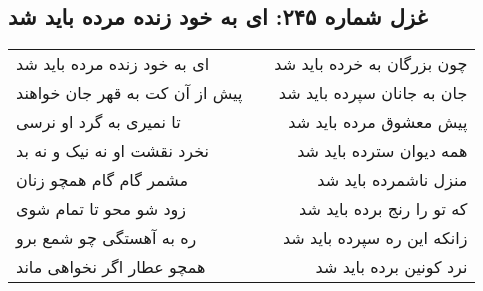 \begin{center}
\section*{غزل شماره ۲۴۵: ای به خود زنده مرده باید شد}
\label{sec:245}
\begin{longtable}{l p{0.5cm} r}
ای به خود زنده مرده باید شد
&&
چون بزرگان به خرده باید شد
\\
پیش از آن کت به قهر جان خواهند
&&
جان به جانان سپرده باید شد
\\
تا نمیری به گرد او نرسی
&&
پیش معشوق مرده باید شد
\\
نخرد نقشت او نه نیک و نه بد
&&
همه دیوان سترده باید شد
\\
مشمر گام گام همچو زنان
&&
منزل ناشمرده باید شد
\\
زود شو محو تا تمام شوی
&&
که تو را رنج برده باید شد
\\
ره به آهستگی چو شمع برو
&&
زانکه این ره سپرده باید شد
\\
همچو عطار اگر نخواهی ماند
&&
نرد کونین برده باید شد
\\
\end{longtable}
\end{center}
